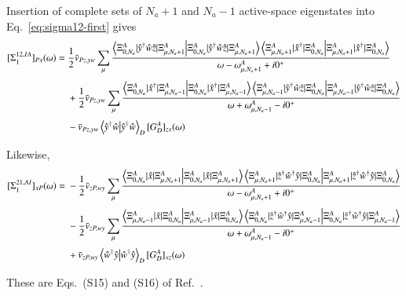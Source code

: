 \documentclass[aip,jcp,reprint,noshowkeys,superscriptaddress]{revtex4-1}
\begin{document}
Insertion of complete sets of $N_a+1$ and $N_a-1$ active-space
eigenstates into Eq.~\eqref{eq:sigma12-first} gives
\begin{equation}
  \begin{aligned}
  [\Sigma_1^{12,IA}]_{Px}(\omega)
  ={}&
  \frac{1}{2}
  \bar v_{Pz,yw}
  \sum_{\mu}
  \frac{
    \braket{
      \Xi_{0,N_a}^{A}
      |
      \hat y^\dagger\hat w\hat z
      |
      \Xi_{\mu,N_a+1}^{A}
    }
    \braket{
      \Xi_{\mu,N_a+1}^{A}
      |
      \hat x^\dagger
      |
      \Xi_{0,N_a}^{A}
    }
  }{
    \omega
    -
    \omega_{\mu,N_a+1}^{A}
    +
    i0^+
  }
  \\[1mm]
  &+
  \frac{1}{2}
  \bar v_{Pz,yw}
  \sum_{\mu}
  \frac{
    \braket{
      \Xi_{0,N_a}^{A}
      |
      \hat x^\dagger
      |
      \Xi_{\mu,N_a-1}^{A}
    }
    \braket{
      \Xi_{\mu,N_a-1}^{A}
      |
      \hat y^\dagger\hat w\hat z
      |
      \Xi_{0,N_a}^{A}
    }
  }{
    \omega
    +
    \omega_{\mu,N_a-1}^{A}
    -
    i0^+
  }
  \\[1mm]
  &-
  \bar v_{Pz,yw}
  \braket{
    \hat y^\dagger\hat w
  }_D
  [G_D^A]_{zx}(\omega)
  \end{aligned}
  \label{eq:sigma12-spectral}
\end{equation}

Likewise,
\begin{equation}
  \begin{aligned}
  [\Sigma_1^{21,AI}]_{xP}(\omega)
  ={}&
  -\frac{1}{2}
  \bar v_{zP,wy}
  \sum_{\mu}
  \frac{
    \braket{
      \Xi_{0,N_a}^{A}
      |
      \hat x
      |
      \Xi_{\mu,N_a+1}^{A}
    }
    \braket{
      \Xi_{\mu,N_a+1}^{A}
      |
      \hat z^\dagger\hat w^\dagger\hat y
      |
      \Xi_{0,N_a}^{A}
    }
  }{
    \omega
    -
    \omega_{\mu,N_a+1}^{A}
    +
    i0^+
  }
  \\[1mm]
  &-
  \frac{1}{2}
  \bar v_{zP,wy}
  \sum_{\mu}
  \frac{
    \braket{
      \Xi_{\mu,N_a-1}^{A}
      |
      \hat x
      |
      \Xi_{0,N_a}^{A}
    }
    \braket{
      \Xi_{0,N_a}^{A}
      |
      \hat z^\dagger\hat w^\dagger\hat y
      |
      \Xi_{\mu,N_a-1}^{A}
    }
  }{
    \omega
    +
    \omega_{\mu,N_a-1}^{A}
    -
    i0^+
  }
  \\[1mm]
  &+
  \bar v_{zP,wy}
  \braket{
    \hat w^\dagger\hat y
  }_D
  [G_D^A]_{xz}(\omega)
  \end{aligned}
  \label{eq:sigma21-spectral}
\end{equation}

These are Eqs.~(S15) and (S16) of
Ref.~\cite{WangFangLi2026}.
\end{document}

